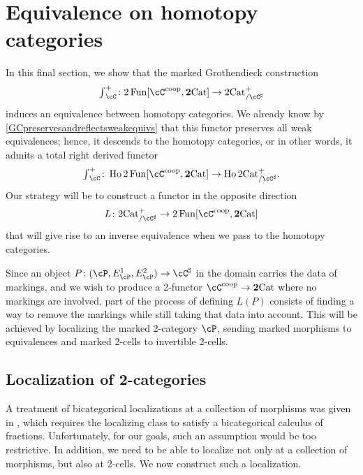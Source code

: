 \documentclass[11pt, dvipsnames]{amsart}
\begin{document}
 \section{Equivalence on homotopy categories}\label{section5}
In this final section, we show that the marked Grothendieck construction 
   \[{\textstyle \int}_{\cC}^+ \colon 2\Fun[\cC^{\coop},\ttwocat]\to \mslicetwocat \]
   induces an equivalence between homotopy categories. We already know by \cref{GCpreservesandreflectsweakequivs} that this functor preserves all weak equivalences; hence, it descends to the homotopy categories, or in other words, it admits a total  right derived functor 
   \[{\textstyle \int}_{\cC}^+ \colon \Ho 2\Fun[\cC^{\coop},\ttwocat] \to \Ho\mslicetwocat. \]
Our strategy will be to construct  a functor in the opposite direction
\[L \colon \mslicetwocat\to  2\Fun[\cC^{\coop},\ttwocat] \]  that will give rise to an inverse equivalence when we pass to the homotopy categories. 


Since an object $P\colon (\cP,E^1_\cP, E^2_\cP)\to\cC^\sharp$ in the domain carries the data of markings, and we wish to produce a 2-functor $\cC^\coop\to\ttwocat$ where no markings are involved, part of the process of defining $L(P)$ consists of finding a way to remove the markings while still taking that data into account. This will be achieved by localizing the marked 2-category $\cP$, sending marked morphisms to equivalences and marked 2-cells to invertible 2-cells. 


\subsection{Localization of 2-categories}\label{subsec.localization}
A treatment of bicategorical localizations at a collection of morphisms was given in \cite{pronk1996etendues}, which requires  the localizing class to satisfy a bicategorical calculus of fractions. Unfortunately, for our goals, such an assumption would be too restrictive. In addition, we need to be able to  localize not only at a collection of morphisms, but also at 2-cells.  We now construct such a localization. 
\end{document}
